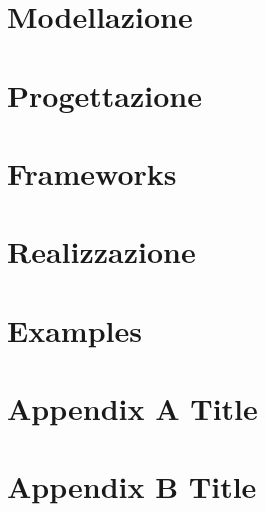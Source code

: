 \chapter{Modellazione}\label{chapter:modellazione}


\chapter{Progettazione}\label{cha:progettazione}


\chapter{Frameworks}\label{cha:frameworks}


\chapter{Realizzazione}\label{cha:realizzazione}




\chapter{Examples}\label{chapter:examples}


\newpage
\setcounter{page}{1}

\appendix
\chapter{Appendix A Title}
\chapter{Appendix B Title}

\newpage
\glsaddall
\renewcommand{\glsgroupskip}{}
\printglossary[type=\acronymtype,style=long,title=Table of Acronyms]

\newpage
\printglossary[style=altlist,title=Glossary]

\cleardoublepage
{}
{}

\footnotesize{
 
}

 
